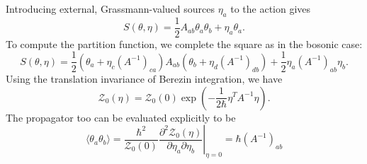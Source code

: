 Introducing external, Grassmann-valued sources $\eta_a$ to the action gives
\begin{equation}
  S(\theta, \eta) = \frac{1}{2} A_{ab} \theta_a \theta_b + \eta_a \theta_a.
\end{equation}
To compute the partition function, we complete the square as in the bosonic case:
\begin{equation}
  S(\theta, \eta) = \frac{1}{2} \left(\theta_a + \eta_c (A^{-1})_{ca}\right) A_{ab} \left(\theta_b + \eta_d (A^{-1})_{db}\right) + \frac{1}{2} \eta_a (A^{-1})_{ab} \eta_b.
\end{equation}
Using the translation invariance of Berezin integration, we have
\begin{equation}
  \mathcal{Z}_0(\eta) = \mathcal{Z}_0 (0) \exp(-\frac{1}{2 \hbar} \eta^T A^{-1} \eta).
\end{equation}
The propagator too can be evaluated explicitly to be
\begin{equation}
  \langle \theta_a \theta_b \rangle = \left.\frac{\hbar^2}{\mathcal{Z}_0 (0)} \frac{\partial^2 \mathcal{Z}_0 (\eta)}{\partial \eta_a \partial \eta_b} \right\rvert_{\eta = 0} = \hbar (A^{-1})_{ab}
\end{equation}
